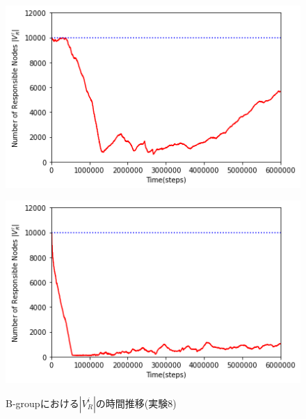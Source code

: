 \documentclass[12pt,a4j,twoside]{jarticle}
\begin{document}
  \begin{figure}
    \begin{minipage}{0.48\hsize}
      \centering
      \includegraphics[width=0.99\hsize]{figures/searchNum_Complex_Bgroup_4.png}
      \label{subfig:search_Complex_B_4}
    \end{minipage}
    \hfill
    \begin{minipage}{0.48\hsize}
      \centering
      \includegraphics[width=0.99\hsize]{figures/searchNum_Complex_Bgroup_16.png}
      \label{subfig:search_Complex_B_16}
    \end{minipage}
    \caption{B-groupにおける$|V^i_R|$の時間推移(実験8)}
    \label{fig:search_Complex_B}
  \end{figure}
\end{document}
